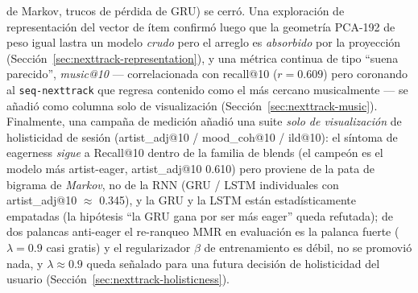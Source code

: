 \documentclass[11pt]{article}
\begin{document}
de Markov, trucos de pérdida de GRU) se cerró. Una exploración de representación del vector
de ítem confirmó luego que la geometría PCA-192 de peso igual lastra un modelo \emph{crudo}
pero el arreglo es \emph{absorbido} por la proyección (Sección~\ref{sec:nexttrack-representation}),
y una métrica continua de tipo ``suena parecido'', \emph{music@10} --- correlacionada con
recall@10 ($r=\num{0.609}$) pero coronando al \texttt{seq-nexttrack} que regresa contenido
como el más cercano musicalmente --- se añadió como columna solo de visualización
(Sección~\ref{sec:nexttrack-music}). Finalmente, una campaña de medición añadió una
suite \emph{solo de visualización} de holisticidad de sesión (artist\_adj@10 /
mood\_coh@10 / ild@10): el síntoma de eagerness \emph{sigue} a Recall@10 dentro de la
familia de blends (el campeón es el modelo más artist-eager, artist\_adj@10 \num{0.610})
pero proviene de la pata de bigrama de \emph{Markov}, no de la RNN (GRU / LSTM
individuales con artist\_adj@10 $\approx$ \num{0.345}), y la GRU y la LSTM están
estadísticamente empatadas (la hipótesis ``la GRU gana por ser más eager'' queda
refutada); de dos palancas anti-eager el re-ranqueo MMR en evaluación es la palanca
fuerte ($\lambda{=}\num{0.9}$ casi gratis) y el regularizador $\beta$ de entrenamiento
es débil, no se promovió nada, y $\lambda\approx\num{0.9}$ queda señalado para una
futura decisión de holisticidad del usuario (Sección~\ref{sec:nexttrack-holisticness}).
\end{document}

